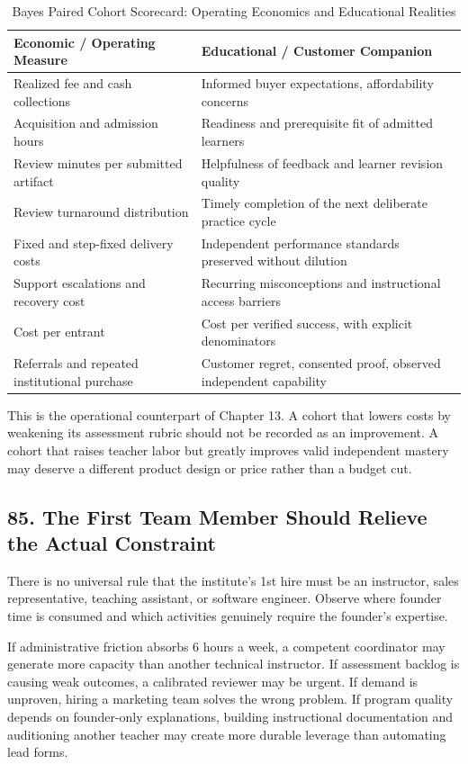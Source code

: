 \begin{table}[t]
\centering
\small
\caption{Bayes Paired Cohort Scorecard: Operating Economics and Educational Realities}
\begin{tabularx}{\textwidth}{p{}X}
\toprule
\textbf{Economic / Operating Measure} & \textbf{Educational / Customer Companion} \\
\midrule
Realized fee and cash collections & Informed buyer expectations, affordability concerns \\
Acquisition and admission hours & Readiness and prerequisite fit of admitted learners \\
Review minutes per submitted artifact & Helpfulness of feedback and learner revision quality \\
Review turnaround distribution & Timely completion of the next deliberate practice cycle \\
Fixed and step-fixed delivery costs & Independent performance standards preserved without dilution \\
Support escalations and recovery cost & Recurring misconceptions and instructional access barriers \\
Cost per entrant & Cost per verified success, with explicit denominators \\
Referrals and repeated institutional purchase & Customer regret, consented proof, observed independent capability \\
\bottomrule
\end{tabularx}
\end{table}

This is the operational counterpart of Chapter 13. A cohort that lowers costs by weakening its assessment rubric should not be recorded as an improvement. A cohort that raises teacher labor but greatly improves valid independent mastery may deserve a different product design or price rather than a budget cut.

\subsection*{85. The First Team Member Should Relieve the Actual Constraint}

There is no universal rule that the institute's 1st hire must be an instructor, sales representative, teaching assistant, or software engineer. Observe where founder time is consumed and which activities genuinely require the founder's expertise.

If administrative friction absorbs 6 hours a week, a competent coordinator may generate more capacity than another technical instructor. If assessment backlog is causing weak outcomes, a calibrated reviewer may be urgent. If demand is unproven, hiring a marketing team solves the wrong problem. If program quality depends on founder-only explanations, building instructional documentation and auditioning another teacher may create more durable leverage than automating lead forms.

